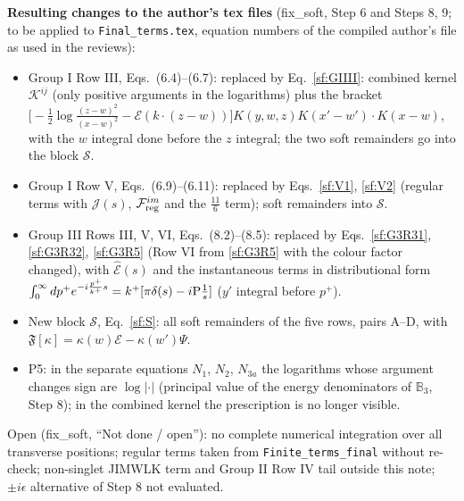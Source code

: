 \documentclass[10pt]{article}
\def\mf#1{\mathbb{#1}}
\begin{document}
\noindent\textbf{Resulting changes to the author's tex files} (fix\_soft, Step 6 and Steps 8, 9; to be applied to \texttt{Final\_terms.tex}, equation numbers of the compiled author's file as used in the reviews):
\begin{itemize}
\item Group I Row III, Eqs.~(6.4)--(6.7): replaced by Eq.~\eqref{sf:GIIII}: combined kernel $\mathcal{K}^{ij}$ (only positive arguments in the logarithms) plus the bracket $\big[-\frac12\log\frac{(z-w)^{2}}{(x-w)^{2}}-\mathcal{E}(k\cdot(z-w))\big]K(y,w,z)K(x'-w')\cdot K(x-w)$, with the $w$ integral done before the $z$ integral; the two soft remainders go into the block $\mathcal{S}$.
\item Group I Row V, Eqs.~(6.9)--(6.11): replaced by Eqs.~\eqref{sf:V1}, \eqref{sf:V2} (regular terms with $\mathcal{J}(s)$, $\mathcal{F}^{im}_{\rm reg}$ and the $\frac{11}{6}$ term); soft remainders into $\mathcal{S}$.
\item Group III Rows III, V, VI, Eqs.~(8.2)--(8.5): replaced by Eqs.~\eqref{sf:G3R31}, \eqref{sf:G3R32}, \eqref{sf:G3R5} (Row VI from \eqref{sf:G3R5} with the colour factor changed), with $\widehat{\mathcal{E}}(s)$ and the instantaneous terms in distributional form $\int_{0}^{\infty}dp^{+}e^{-i\frac{p^{+}}{k^{+}}s}=k^{+}[\pi\delta(s)-i{\rm P}\frac1s]$ ($y'$ integral before $p^{+}$).
\item New block $\mathcal{S}$, Eq.~\eqref{sf:S}: all soft remainders of the five rows, pairs A--D, with $\mathfrak{F}[\kappa]=\kappa(w)\mathcal{E}-\kappa(w')\Psi$.
\item P5: in the separate equations $N_{1}$, $N_{2}$, $N_{3a}$ the logarithms whose argument changes sign are $\log|\cdot|$ (principal value of the energy denominators of $\mf{B}_{3}$, Step 8); in the combined kernel the prescription is no longer visible.
\end{itemize}
\noindent Open (fix\_soft, ``Not done / open''): no complete numerical integration over all transverse positions; regular terms taken from \texttt{Finite\_terms\_final} without re-check; non-singlet JIMWLK term and Group II Row IV tail outside this note; $\pm i\epsilon$ alternative of Step 8 not evaluated.
\end{document}
